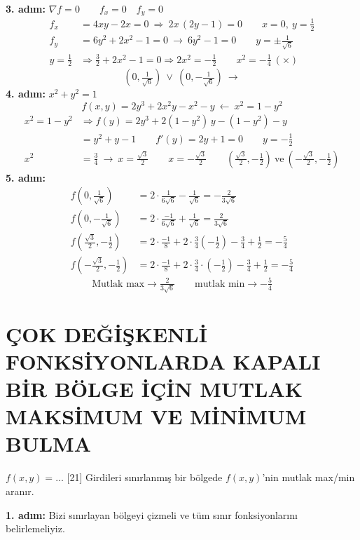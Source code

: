 \documentclass[11pt,a4paper]{article}
\begin{document}
\noindent\textbf{3. adım:} $\nabla f=0\qquad f_x=0\quad f_y=0$
\begin{align*}
f_x&=4xy-2x=0\ \Longrightarrow\ 2x\,(2y-1)=0\qquad x=0,\ y=\tfrac12\\
f_y&=6y^2+2x^2-1=0\ \longrightarrow\ 6y^2-1=0\qquad y=\pm\tfrac{1}{\sqrt6}\\
y=\tfrac12&\Longrightarrow \tfrac32+2x^2-1=0\Longrightarrow 2x^2=-\tfrac12\qquad x^2=-\tfrac14\ (\times)
\end{align*}
\[ \left(0,\tfrac{1}{\sqrt6}\right)\ \vee\ \left(0,-\tfrac{1}{\sqrt6}\right)\ \longrightarrow \]
\noindent\textbf{4. adım:} $x^2+y^2=1$
\[ f(x,y)=2y^3+2x^2y-x^2-y\ \longleftarrow\ x^2=1-y^2 \]
\begin{align*}
x^2=1-y^2&\Longrightarrow f(y)=2y^3+2(1-y^2)\,y-(1-y^2)-y\\
&=y^2+y-1\qquad f'(y)=2y+1=0\qquad y=-\tfrac12\\
x^2&=\tfrac34\ \longrightarrow\ x=\tfrac{\sqrt3}{2}\qquad x=-\tfrac{\sqrt3}{2}\qquad \left(\tfrac{\sqrt3}{2},-\tfrac12\right)\ \text{ve}\ \left(-\tfrac{\sqrt3}{2},-\tfrac12\right)
\end{align*}
\noindent\textbf{5. adım:}
\begin{align*}
f\!\left(0,\tfrac{1}{\sqrt6}\right)&=2\cdot\tfrac{1}{6\sqrt6}-\tfrac{1}{\sqrt6}=-\tfrac{2}{3\sqrt6}\\
f\!\left(0,-\tfrac{1}{\sqrt6}\right)&=2\cdot\tfrac{-1}{6\sqrt6}+\tfrac{1}{\sqrt6}=\tfrac{2}{3\sqrt6}\\
f\!\left(\tfrac{\sqrt3}{2},-\tfrac12\right)&=2\cdot\tfrac{-1}{8}+2\cdot\tfrac34\left(-\tfrac12\right)-\tfrac34+\tfrac12=-\tfrac54\\
f\!\left(-\tfrac{\sqrt3}{2},-\tfrac12\right)&=2\cdot\tfrac{-1}{8}+2\cdot\tfrac34\cdot\left(-\tfrac12\right)-\tfrac34+\tfrac12=-\tfrac54
\end{align*}
\[ \text{Mutlak max}\longrightarrow \tfrac{2}{3\sqrt6}\qquad \text{mutlak min}\longrightarrow -\tfrac54 \]

\section{ÇOK DEĞİŞKENLİ FONKSİYONLARDA KAPALI BİR BÖLGE İÇİN MUTLAK MAKSİMUM VE MİNİMUM BULMA}

$f(x,y)=\dots$
[21]
Girdileri sınırlanmış bir bölgede $f(x,y)$'nin mutlak max/min aranır.

\noindent\textbf{1. adım:} Bizi sınırlayan bölgeyi çizmeli ve tüm sınır fonksiyonlarını belirlemeliyiz.
\end{document}
